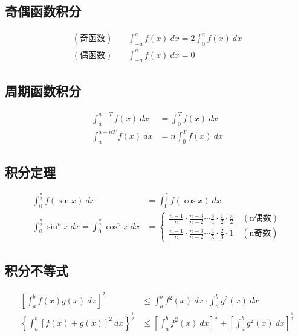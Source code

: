 \subsection{奇偶函数积分}
	\begin{align}
	(\mbox{奇函数})\quad	&\int_{-a}^{a}f(x)\ dx=2\int_{0}^{a}f(x)\ dx\label{Odd_even_function_integral_1}\\
	(\mbox{偶函数})\quad	&\int_{-a}^{a}f(x)\ dx=0\label{Odd_even_function_integral_2}
	\end{align}
\subsection{周期函数积分}
	\begin{align}
		\int_{a}^{a+T}f(x)\ dx&=\int_{0}^{T}f(x)\ dx\label{Periodic_function_integral_1}\\
		\int_{a}^{a+nT}f(x)\ dx&=n\int_{0}^{T}f(x)\ dx\label{Periodic_function_integral_2}
	\end{align}
\subsection{积分定理}
\begin{align}
	\int_{0}^{\frac{\pi}{2}}f(\sin x)\ dx&=\int_{0}^{\frac{\pi}{2}}f(\cos x)\ dx\label{Definite_integral_theorem_1}\\
	\int_{0}^{\frac{\pi}{2}}\sin^n x\ dx=\int_{0}^{\frac{\pi}{2}}\cos^n x\ dx&=\begin{cases}
				\frac{n-1}{n}\cdot\frac{n-3}{n-2}\cdots\frac{3}{4}\cdot\frac{1}{2}\cdot\frac{\pi}{2}\quad(\mbox{n偶数})\\
		\frac{n-1}{n}\cdot\frac{n-3}{n-2}\cdots\frac{4}{5}\cdot\frac{2}{3}\cdot 1\quad(\mbox{n奇数})
	\end{cases}\label{Definite_integral_theorem_2}
\end{align}
\subsection{积分不等式}
\begin{align}
	\left[\int_{a}^{b}f(x)g(x)\ dx\right]^2&\leqslant \int_{a}^{b}f^2(x)\ dx\cdot \int_{a}^{b}g^2(x)\ dx \label{Definite_integral_inequality_1}\\
	\left\{\int_{a}^{b}\left[f(x)+g(x)\right]^2 \ dx\right\}^{\frac{1}{2}}&\leqslant \left[\int_{a}^{b}f^2(x)\ dx\right]^{\frac{1}{2}}+\left[\int_{a}^{b}g^2(x)\ dx\right]^{\frac{1}{2}}\label{Definite_integral_inequality_2}\\
\end{align}
